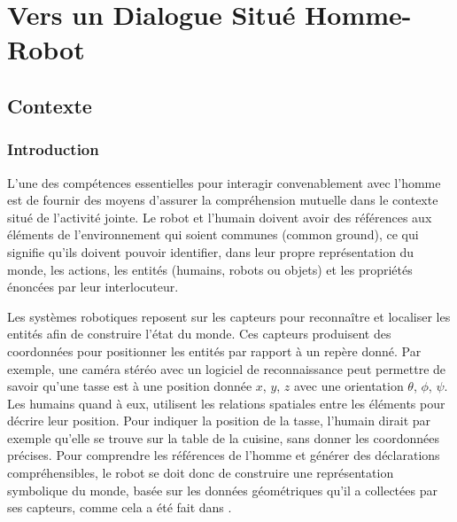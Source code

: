 \documentclass[a4paper,11pt,twoside]{StyleThese}
\begin{document}
\setcounter{chapter}{3} %
\dominitoc
\faketableofcontents
\fi

\chapter{Vers un Dialogue Situé Homme-Robot}
\label{chapter3}
\minitoc

\section{Contexte}

\subsection{Introduction}
L'une des compétences essentielles pour interagir convenablement avec l'homme est de fournir des moyens d'assurer la compréhension mutuelle dans le contexte situé de l'activité jointe. Le robot et l'humain doivent avoir des références aux éléments de l'environnement qui soient communes (common ground), ce qui signifie qu'ils doivent pouvoir identifier, dans leur propre représentation du monde, les actions, les entités (humains, robots ou objets) et les propriétés énoncées par leur interlocuteur.

Les systèmes robotiques reposent sur les capteurs pour reconnaître et localiser les entités afin de construire l'état du monde. Ces capteurs produisent des coordonnées pour positionner les entités par rapport à un repère donné. Par exemple, une caméra stéréo avec un logiciel de reconnaissance peut permettre de savoir qu'une tasse est à une position donnée  $x$, $y$, $z$ avec une orientation $\theta$, $\phi$, $\psi$.
Les humains quand à eux, utilisent les relations spatiales entre les éléments pour décrire leur position. Pour indiquer la position de la tasse, l'humain dirait par exemple qu'elle se trouve sur la table de la cuisine, sans donner les coordonnées précises.
Pour comprendre les références de l'homme et générer des déclarations compréhensibles, le robot se doit donc de construire une représentation symbolique du monde, basée sur les données géométriques qu'il a collectées par ses capteurs, comme cela a été fait dans \cite{lemaignan2012grounding}.

\end{document}
